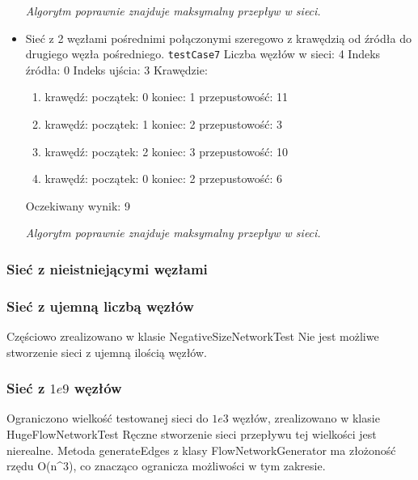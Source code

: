 \begin{itemize}[nosep]
    \emph{Algorytm poprawnie znajduje maksymalny przepływ w sieci.}

    \item Sieć z 2 węzłami pośrednimi połączonymi szeregowo z krawędzią od
    źródła do drugiego węzła pośredniego.
    \texttt{testCase7}
    Liczba węzłów w sieci: 4
    Indeks źródła: 0
    Indeks ujścia: 3
    Krawędzie:
    \begin{enumerate}[nosep]
        \item krawędź:
        początek: 0
        koniec: 1
        przepustowość: 11
        \item krawędź:
        początek: 1
        koniec: 2
        przepustowość: 3
        \item krawędź:
        początek: 2
        koniec: 3
        przepustowość: 10
        \item krawędź:
        początek: 0
        koniec: 2
        przepustowość: 6
    \end{enumerate}
    Oczekiwany wynik: 9

    \emph{Algorytm poprawnie znajduje maksymalny przepływ w sieci.}

\end{itemize}


\subsubsection{Sieć z nieistniejącymi węzłami}


\subsubsection{Sieć z ujemną liczbą węzłów}
Częściowo zrealizowano w klasie NegativeSizeNetworkTest Nie jest możliwe
stworzenie sieci z ujemną ilością węzłów.

\subsubsection{Sieć z $1e9$ węzłów}
Ograniczono wielkość testowanej sieci do $1e3$ węzłów, zrealizowano w klasie
HugeFlowNetworkTest Ręczne stworzenie sieci przepływu tej wielkości jest
nierealne. Metoda generateEdges z klasy FlowNetworkGenerator ma złożoność
rzędu O(n^3), co znacząco ogranicza możliwości w tym zakresie.

